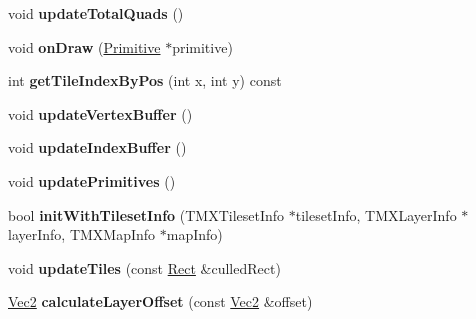 \begin{DoxyCompactItemize}
\item 
\mbox{\label{classexperimental_1_1TMXLayer_a9f8bb3dd84f3e7aea950e77b2d6cef10}} 
void {\bfseries update\+Total\+Quads} ()
\item 
\mbox{\label{classexperimental_1_1TMXLayer_a7d9b155429474e497d46ec27b1ed2a82}} 
void {\bfseries on\+Draw} (\hyperlink{classPrimitive}{Primitive} $\ast$primitive)
\item 
\mbox{\label{classexperimental_1_1TMXLayer_a438e8cddaa688f13e525e048eebd424f}} 
int {\bfseries get\+Tile\+Index\+By\+Pos} (int x, int y) const
\item 
\mbox{\label{classexperimental_1_1TMXLayer_af66e525ea5dba59ce1232b47698d8a53}} 
void {\bfseries update\+Vertex\+Buffer} ()
\item 
\mbox{\label{classexperimental_1_1TMXLayer_a4fcc06ec7301077e715321391e4987e3}} 
void {\bfseries update\+Index\+Buffer} ()
\item 
\mbox{\label{classexperimental_1_1TMXLayer_a43381a1b98c3885785438b7c5deee99a}} 
void {\bfseries update\+Primitives} ()
\item 
\mbox{\label{classexperimental_1_1TMXLayer_ae68b968c865dc6e75ad316ea6f3990d7}} 
bool {\bfseries init\+With\+Tileset\+Info} (T\+M\+X\+Tileset\+Info $\ast$tileset\+Info, T\+M\+X\+Layer\+Info $\ast$layer\+Info, T\+M\+X\+Map\+Info $\ast$map\+Info)
\item 
\mbox{\label{classexperimental_1_1TMXLayer_a9b3cec31c0ad38ddbc17cc834012e2db}} 
void {\bfseries update\+Tiles} (const \hyperlink{classRect}{Rect} \&culled\+Rect)
\item 
\mbox{\label{classexperimental_1_1TMXLayer_afd1d4957d24472e1aa24df8a6e0ac28a}} 
\hyperlink{classVec2}{Vec2} {\bfseries calculate\+Layer\+Offset} (const \hyperlink{classVec2}{Vec2} \&offset)
\item 
\mbox{\label{classexperimental_1_1TMXLayer_aa437daeffb645dbba51af26faa2e788b}} 

\end{DoxyCompactItemize}
